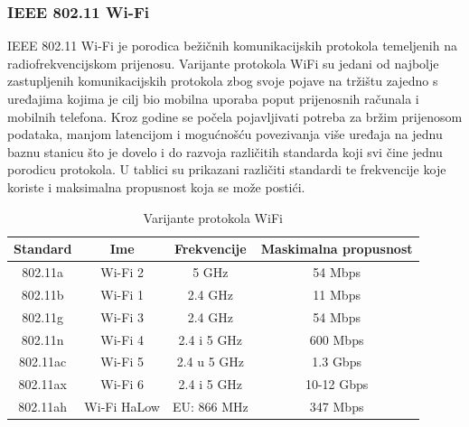 \documentclass[times, utf8, diplomski]{fer}
\begin{document}
\subsubsection{IEEE 802.11 Wi-Fi}
IEEE 802.11 Wi-Fi je porodica bežičnih komunikacijskih protokola temeljenih na radiofrekvencijskom prijenosu. Varijante protokola WiFi su jedani od najbolje zastupljenih komunikacijskih protokola zbog svoje pojave na tržištu zajedno s uređajima kojima je cilj bio mobilna uporaba poput prijenosnih računala i mobilnih telefona. Kroz godine se počela pojavljivati potreba za bržim prijenosom podataka, manjom latencijom i mogućnošću povezivanja više uređaja na jednu baznu stanicu  što je dovelo i do razvoja različitih standarda koji svi čine jednu porodicu protokola. U tablici su prikazani različiti standardi te frekvencije koje koriste i maksimalna propusnost koja se može postići.
\begin{table}[H]
    \centering
    \caption{Varijante protokola WiFi}
    \begin{tabular}{| c | c | c | c |} 
    \hline
    \textbf{Standard} & \textbf{Ime} & \textbf{Frekvencije} & \textbf{Maskimalna propusnost}\\
    \hline\hline
    802.11a & Wi-Fi 2 & 5 GHz & 54 Mbps\\
    \hline
    802.11b & Wi-Fi 1 & 2.4 GHz & 11 Mbps\\ 
    \hline
    802.11g & Wi-Fi 3 & 2.4 GHz & 54 Mbps\\ 
    \hline
    802.11n & Wi-Fi 4 & 2.4 i 5 GHz & 600 Mbps\\ 
    \hline
    802.11ac & Wi-Fi 5 & 2.4 u 5 GHz & 1.3 Gbps \\ 
    \hline
    802.11ax & Wi-Fi 6 & 2.4 i 5 GHz & 10-12 Gbps\\ 
    \hline
    802.11ah & Wi-Fi HaLow & EU: 866 MHz & 347 Mbps\\ 
    \hline
    \end{tabular}
    \label{tab:wifi}
\end{table}
\end{document}
